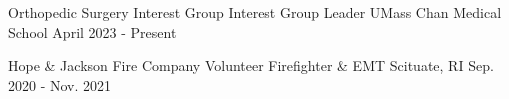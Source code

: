 

\begin{cventries}

\vspace{-1mm}
\cventry
  {Orthopedic Surgery Interest Group} %
  {Interest Group Leader} %
  {UMass Chan Medical School} %
  {April 2023 - Present} %
  {}

\vspace{-4mm}

  \cventry
    {Hope \& Jackson Fire Company} %
    {Volunteer Firefighter \& EMT} %
    {Scituate, RI} %
    {Sep. 2020 - Nov. 2021} %
    {}

\vspace{-4mm}
\end{cventries}
